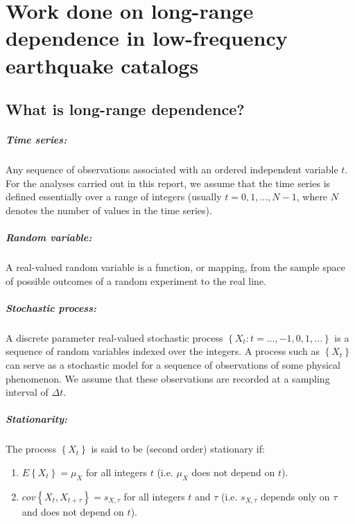 \documentclass[workdone.tex]{subfiles}
\begin{document}
\chapter{Work done on long-range dependence in low-frequency earthquake catalogs}

\section{What is long-range dependence?}

\paragraph{Time series:} Any sequence of observations associated with an ordered independent variable $t$. For the analyses carried out in this report, we assume that the time series is defined essentially over a range of integers (usually $t = 0 , 1 , ... , N - 1$, where $N$ denotes the number of values in the time series).

\paragraph{Random variable:} A real-valued random variable is a function, or mapping, from the sample space of possible outcomes of a random experiment to the real line.

\paragraph{Stochastic process:} A discrete parameter real-valued stochastic process $\left\{ X_t : t = ... , -1 , 0 , 1 , ... \right\}$ is a sequence of random variables indexed over the integers. A process such as $\left\{ X_t \right\}$ can serve as a stochastic model for a sequence of observations of some physical phenomenon. We assume that these observations are recorded at a sampling interval of $\Delta t$.

\paragraph{Stationarity:} The process $\left\{ X_t \right\} $ is said to be (second order) stationary if:
\begin{enumerate}
\item $E \left\{ X_t \right\} = \mu_X$ for all integers $t$ (i.e. $\mu_X$ does not depend on $t$).
\item $cov \left\{ X_t , X_{t + \tau} \right\} = s_{X , \tau}$ for all integers $t$ and $\tau$ (i.e. $s_{X , \tau}$ depends only on $\tau$ and does not depend on $t$).
\end{enumerate}
\end{document}
